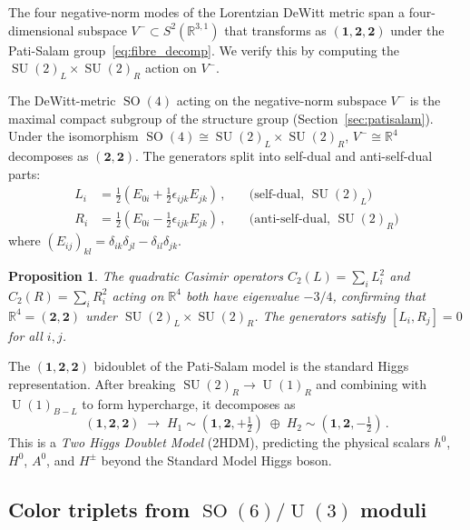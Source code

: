 \documentclass[12pt,a4paper]{article}
\newtheorem{proposition}[theorem]{Proposition}
\theoremstyle{definition}
\newcommand{\SO}{\operatorname{SO}}
\newcommand{\SU}{\operatorname{SU}}
\newcommand{\U}{\operatorname{U}}
\newcommand{\R}{\mathbb{R}}
\begin{document}
The four negative-norm modes of the Lorentzian DeWitt metric span a four-dimensional subspace $V^- \subset S^2(\R^{3,1})$ that transforms as $(\mathbf{1}, \mathbf{2}, \mathbf{2})$ under the Pati-Salam group~\eqref{eq:fibre_decomp}.
We verify this by computing the $\SU(2)_L \times \SU(2)_R$ action on $V^-$.

The DeWitt-metric $\SO(4)$ acting on the negative-norm subspace $V^-$ is the maximal compact subgroup of the structure group (Section~\ref{sec:patisalam}).
Under the isomorphism $\SO(4) \cong \SU(2)_L \times \SU(2)_R$, $V^- \cong \R^4$ decomposes as $(\mathbf{2}, \mathbf{2})$.
The generators split into self-dual and anti-self-dual parts:
\begin{equation}
\begin{aligned}
L_i &= \tfrac{1}{2}(E_{0i} + \tfrac{1}{2}\epsilon_{ijk} E_{jk})\,, \quad &\text{(self-dual, } \SU(2)_L\text{)}\\
R_i &= \tfrac{1}{2}(E_{0i} - \tfrac{1}{2}\epsilon_{ijk} E_{jk})\,, \quad &\text{(anti-self-dual, } \SU(2)_R\text{)}
\end{aligned}
\end{equation}
where $(E_{ij})_{kl} = \delta_{ik}\delta_{jl} - \delta_{il}\delta_{jk}$.

\begin{proposition}
\label{prop:bidoublet}
The quadratic Casimir operators $C_2(L) = \sum_i L_i^2$ and $C_2(R) = \sum_i R_i^2$ acting on $\R^4$ both have eigenvalue $-3/4$, confirming that $\R^4 = (\mathbf{2}, \mathbf{2})$ under $\SU(2)_L \times \SU(2)_R$.
The generators satisfy $[L_i, R_j] = 0$ for all $i, j$.
\end{proposition}

The $(\mathbf{1}, \mathbf{2}, \mathbf{2})$ bidoublet of the Pati-Salam model is the standard Higgs representation.
After breaking $\SU(2)_R \to \U(1)_R$ and combining with $\U(1)_{B-L}$ to form hypercharge, it decomposes as
\begin{equation}
(\mathbf{1}, \mathbf{2}, \mathbf{2}) \;\to\; H_1 \sim (\mathbf{1}, \mathbf{2}, +\tfrac{1}{2}) \;\oplus\; H_2 \sim (\mathbf{1}, \mathbf{2}, -\tfrac{1}{2})\,.
\end{equation}
This is a \emph{Two Higgs Doublet Model} (2HDM), predicting the physical scalars $h^0$, $H^0$, $A^0$, and $H^\pm$ beyond the Standard Model Higgs boson.

\subsection{Color triplets from $\SO(6)/\U(3)$ moduli}
\label{sec:color_triplets}
\end{document}
